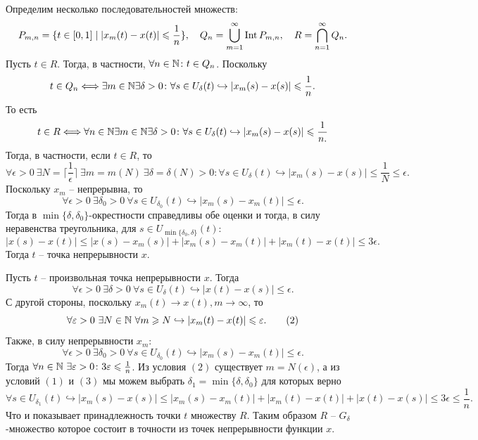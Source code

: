 \begin{solve}
\begin{enumerate}
        Определим несколько последовательностей множеств:
        \[P_{m, n} = \{t \in [0, 1] \mid |x_m(t) - x(t)| \leqslant \frac{1}{n}\}, \quad Q_n = \bigcup_{m = 1}^{\infty} \operatorname{Int} P_{m, n}, \quad R = \bigcap_{n = 1}^{\infty} Q_n.\]
        Пусть $t \in R$. Тогда, в частности, $\forall n \in \mathbb{N}\colon t \in Q_n$. Поскольку \[t \in Q_n \Longleftrightarrow \exists m\in \mathbb{N} \exists \delta > 0\colon \forall s \in U_\delta(t) \hookrightarrow |x_m(s) - x(s)| \leqslant \frac{1}{n}.\]
        То есть
        \[
            t \in R \Longleftrightarrow \forall n \in \mathbb{N} \exists m \in \mathbb{N} \exists \delta > 0\colon \forall s \in U_\delta(t) \hookrightarrow |x_m(s) - x(s)| \leqslant \frac{1}{n.}
        \]
        Тогда, в частности, если $t \in R$, то
        \[\forall \epsilon > 0 \ \exists N = \lceil \frac{1}{\epsilon} \rceil \  \exists m = m(N) \ \exists \delta = \delta(N) > 0\colon  \forall s \in U_{\delta}(t) \hookrightarrow |x_m(s) - x(s)| \leq \frac{1}{N} \leq \epsilon.\]
        Поскольку $x_m$ -- непрерывна, то
        \[
            \forall \epsilon > 0 \ \exists \delta_0 > 0 \ \forall s \in U_{\delta_0}(t) \hookrightarrow |x_m(s) - x_m(t)| \leq \epsilon.
        \]
        Тогда в $\min\{\delta, \delta_0\}$-окрестности справедливы обе оценки и тогда, в силу неравенства треугольника, для $s \in U_{\min\{\delta_0, \delta\}}(t)\colon$
        \[
            |x(s) - x(t)| \leq |x(s) - x_m(s)| + |x_m(s) - x_m(t)| + |x_m(t) - x(t)| \leq 3\epsilon.
        \]
        Тогда $t$ -- точка непрерывности $x$.

        Пусть $t$ -- произвольная точка непрерывности $x$. Тогда
        \[
            \forall \epsilon > 0 \ \exists \delta > 0 \ \forall s \in U_\delta(t) \hookrightarrow |x(t) - x(s)| \leq \epsilon. \tag{1}
        \]
        С другой стороны, поскольку $x_m(t) \rightarrow x(t), m \rightarrow \infty$, то
        \[
            \forall \varepsilon > 0 \ \exists N \in \mathbb{N} \  \forall m \geqslant N \hookrightarrow |x_m(t) - x(t)| \leqslant \varepsilon. \tag{2}
        \]
        Также, в силу непрерывности $x_m\colon$
        \[
            \forall \epsilon > 0 \ \exists \delta_0 > 0 \  \forall s \in U_{\delta_0}(t) \hookrightarrow |x_m(s) - x_m(t)| \leq \epsilon. \tag{3}
        \]
        Тогда $\forall n \in \mathbb{N} \ \exists \varepsilon > 0 \colon 3\varepsilon \leqslant \frac{1}{n}$.  Из условия $(2)$ существует $m = N(\epsilon)$, а из условий $(1)$ и $(3)$ мы можем выбрать $\delta_1 = \min\{\delta, \delta_0\}$ для которых верно
        \[
            \forall s \in U_{\delta_1}(t) \hookrightarrow |x_m(s) - x(s)| \leq |x_m(s) - x_m(t)| + |x_m(t) - x(t)| + |x(t) - x(s)| \leq 3\epsilon \leq \frac{1}{n}.
        \]
        Что и показывает принадлежность точки $t$ множеству $R$. Таким образом $R$ -- $G_\delta$-множество которое состоит в точности из точек непрерывности функции $x$.


\end{enumerate}
\end{solve}
